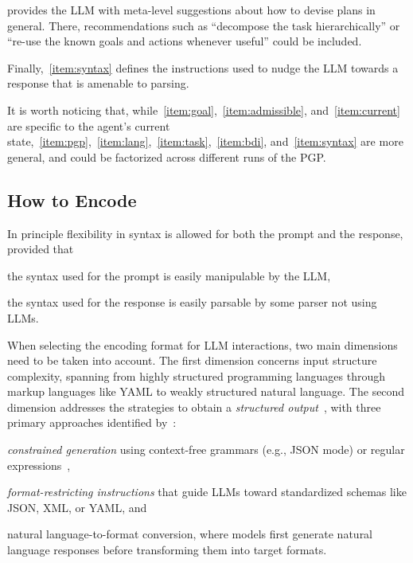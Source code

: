 \documentclass[12pt,a4paper,openright,twoside]{book}
\begin{document}
 provides the \ac{LLM} with meta-level suggestions about how to devise plans in general.
%
There, recommendations such as ``decompose the task hierarchically'' or ``re-use the known goals and actions whenever useful'' could be included.

Finally,~\cref{item:syntax} defines the instructions used to nudge the LLM towards a response that is amenable to parsing.

It is worth noticing that, while~\cref{item:goal},~\cref{item:admissible}, and~\cref{item:current} are specific to the agent's current state,~\cref{item:pgp},~\cref{item:lang},~\cref{item:task},~\cref{item:bdi}, and~\cref{item:syntax} are more general, and could be factorized across different runs of the \ac{PGP}.

\subsection{How to Encode}\label{sec:prompt-encoding}

In principle flexibility in syntax is allowed for both the prompt and the response, provided that
%
\begin{inlinelist}
    \item\label{syntax:prompt} the syntax used for the prompt is easily manipulable by the \ac{LLM},
    \item\label{syntax:response} the syntax used for the response is easily parsable by some parser not using \acp{LLM}.
\end{inlinelist}

When selecting the encoding format for LLM interactions, two main dimensions need to be taken into account. 
%
The first dimension concerns input structure complexity, spanning from highly structured programming languages through markup languages like YAML to weakly structured natural language.
%
The second dimension addresses the strategies to obtain a \emph{structured output}~\cite{TangZPZCG23}, with three primary approaches identified by~\cite{tamLetMeSpeak2024}:
%
\begin{inlinelist}
\item \emph{constrained generation} using context-free grammars (e.g., JSON mode) or regular expressions~\cite{willardEfficientGuidedGeneration2023},
\item \emph{format-restricting instructions} that guide LLMs toward standardized schemas like JSON, XML, or YAML, and
\item natural language-to-format conversion, where models first generate natural language responses before transforming them into target formats.
\end{inlinelist}
\end{document}
